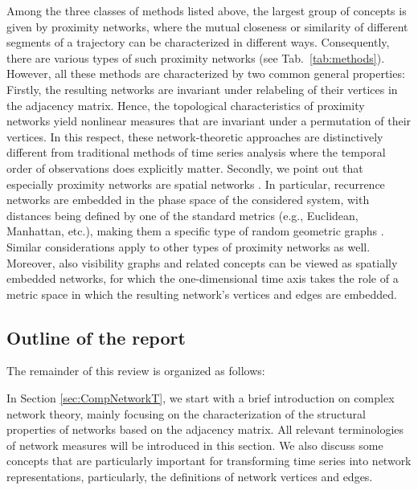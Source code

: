 	Among the three classes of methods listed above, the largest group of concepts is given by proximity networks, where the mutual closeness or similarity of different segments of a trajectory can be characterized in different ways. Consequently, there are various types of such proximity networks (see Tab.~\ref{tab:methods}). However, all these methods are characterized by two common general properties: Firstly, the resulting networks are invariant under relabeling of their vertices in the adjacency matrix. Hence, the topological characteristics of proximity networks yield nonlinear measures that are invariant under a permutation of their vertices. In this respect, these network-theoretic approaches are distinctively different from traditional methods of time series analysis where the temporal order of observations does explicitly matter. Secondly, we point out that especially proximity networks are spatial networks \cite{Barthelemy2011,Wiedermann2016}. In particular, recurrence networks are embedded in the phase space of the considered system, with distances being defined by one of the standard metrics (e.g., Euclidean, Manhattan, etc.), making them a specific type of random geometric graphs \cite{Donner2011b}. Similar considerations apply to other types of proximity networks as well. Moreover, also visibility graphs and related concepts can be viewed as spatially embedded networks, for which the one-dimensional time axis takes the role of a metric space in which the resulting network's vertices and edges are embedded.

\subsection{Outline of the report}
The remainder of this review is organized as follows: 

In Section \ref{sec:CompNetworkT}, we start with a brief introduction on complex network theory, mainly focusing on the characterization of the structural properties of networks based on the adjacency matrix. All relevant terminologies of network measures will be introduced in this section. We also discuss some concepts that are particularly important for transforming time series into network representations, particularly, the definitions of network vertices and edges. 

